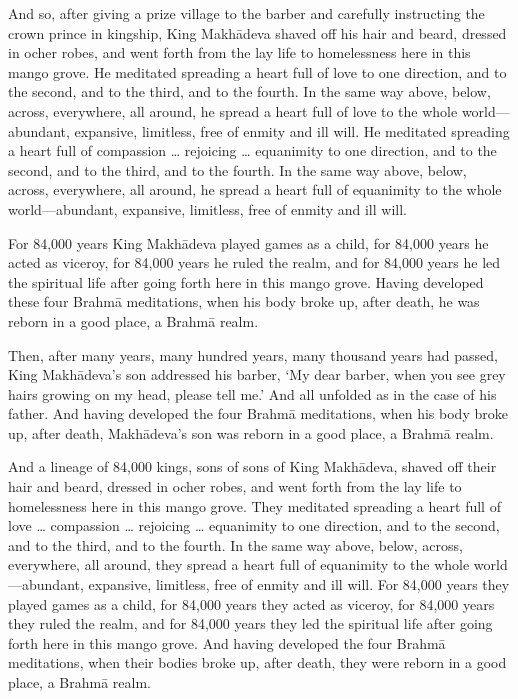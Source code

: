 \documentclass[12pt,openany]{book}%
\begin{document}
And so, after giving a prize village to the barber and carefully instructing the crown prince in kingship, King \textsanskrit{Makhādeva} shaved off his hair and beard, dressed in ocher robes, and went forth from the lay life to homelessness here in this mango grove. He meditated spreading a heart full of love to one direction, and to the second, and to the third, and to the fourth. In the same way above, below, across, everywhere, all around, he spread a heart full of love to the whole world—abundant, expansive, limitless, free of enmity and ill will. He meditated spreading a heart full of compassion … rejoicing … equanimity to one direction, and to the second, and to the third, and to the fourth. In the same way above, below, across, everywhere, all around, he spread a heart full of equanimity to the whole world—abundant, expansive, limitless, free of enmity and ill will. 

For 84,000 years King \textsanskrit{Makhādeva} played games as a child, for 84,000 years he acted as viceroy, for 84,000 years he ruled the realm, and for 84,000 years he led the spiritual life after going forth here in this mango grove. Having developed these four \textsanskrit{Brahmā} meditations, when his body broke up, after death, he was reborn in a good place, a \textsanskrit{Brahmā} realm. 

Then, after many years, many hundred years, many thousand years had passed, King \textsanskrit{Makhādeva}’s son addressed his barber, ‘My dear barber, when you see grey hairs growing on my head, please tell me.’ And all unfolded as in the case of his father. And having developed the four \textsanskrit{Brahmā} meditations, when his body broke up, after death, \textsanskrit{Makhādeva}’s son was reborn in a good place, a \textsanskrit{Brahmā} realm. 

And a lineage of 84,000 kings, sons of sons of King \textsanskrit{Makhādeva}, shaved off their hair and beard, dressed in ocher robes, and went forth from the lay life to homelessness here in this mango grove. They meditated spreading a heart full of love … compassion … rejoicing … equanimity to one direction, and to the second, and to the third, and to the fourth. In the same way above, below, across, everywhere, all around, they spread a heart full of equanimity to the whole world—abundant, expansive, limitless, free of enmity and ill will. For 84,000 years they played games as a child, for 84,000 years they acted as viceroy, for 84,000 years they ruled the realm, and for 84,000 years they led the spiritual life after going forth here in this mango grove. And having developed the four \textsanskrit{Brahmā} meditations, when their bodies broke up, after death, they were reborn in a good place, a \textsanskrit{Brahmā} realm. 
\end{document}
